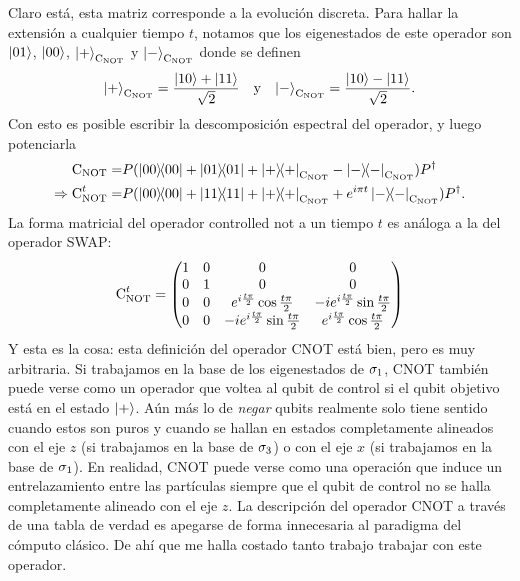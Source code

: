 Claro está, esta matriz corresponde a la evolución discreta. Para hallar la extensión a cualquier tiempo $t$, notamos que los eigenestados de este operador son $\ket{01}$, $\ket{00}$, $\ket{+}_{\text{C}_{\text{NOT}}}$ y $\ket{-}_{\text{C}_{\text{NOT}}}$ donde se definen
\begin{align*}
  \ket{+}_{\text{C}_{\text{NOT}}}=\frac{\ket{10}+\ket{11}}{\sqrt{2}} & & \text{y} & & \ket{-}_{\text{C}_{\text{NOT}}}=\frac{\ket{10}-\ket{11}}{\sqrt{2}}.
\end{align*}
Con esto es posible escribir la descomposición espectral del operador, y luego potenciarla 
\begin{align*}
\cnot=&P(\dyad{00}+\dyad{01}+\dyad{+}_{\cnot}-\dyad{-}_{\cnot})P^{\dag}\\
\Rightarrow \cnot^{t}=&P(\dyad{00}+\dyad{11}+\dyad{+}_{\cnot}+e^{i \pi t}\dyad{-}_{\cnot})P^{\dag}.
\end{align*}
La forma matricial del operador controlled not a un tiempo $t$ es análoga a la del operador SWAP:
\begin{equation}\label{eq:CNOT(t)}
\text{C}_{\text{NOT}}^{t}=\begin{pmatrix}
  1 & 0 & 0 & 0 \\
  0 & 1 & 0 & 0 \\
  0 & 0 & e^{i\frac{t\pi}{2}}\cos{\frac{t\pi}{2}} & -ie^{i\frac{t\pi}{2}}\sin{\frac{t\pi}{2}}\\
  0 & 0 & -ie^{i\frac{t\pi}{2}}\sin{\frac{t\pi}{2}} & e^{i\frac{t\pi}{2}}\cos{\frac{t\pi}{2}}
 \end{pmatrix}
\end{equation}
Y esta es la cosa: esta definición del operador CNOT está bien, pero es muy arbitraria. Si trabajamos en la base de los eigenestados de $\sigma_{1}$, CNOT también puede verse como un operador que voltea al qubit de control si el qubit objetivo está en el estado $\ket{+}$. Aún más lo de \textit{negar} qubits realmente solo tiene sentido cuando estos son puros y cuando se hallan en estados completamente alineados con el eje $z$ (si trabajamos en la base de $\sigma_{3}$) o con el eje $x$ (si trabajamos en la base de $\sigma_{1}$). En realidad, CNOT puede verse como una operación que induce un entrelazamiento entre las partículas siempre que el qubit de control no se halla completamente alineado con el eje $z$. La descripción del operador CNOT a través de una tabla de verdad es apegarse de forma innecesaria al paradigma del cómputo clásico. De ahí que me halla costado tanto trabajo trabajar con este operador.

